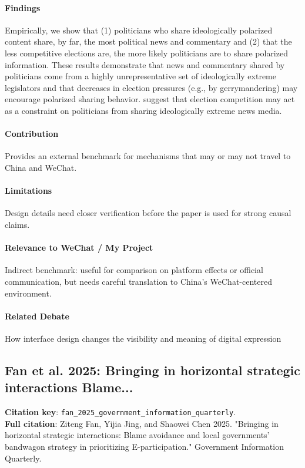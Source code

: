 \documentclass[12pt]{article}
\begin{document}
\paragraph{Findings} Empirically, we show that (1) politicians who share ideologically polarized content share, by far, the most political news and commentary and (2) that the less competitive elections are, the more likely politicians are to share polarized information. These results demonstrate that news and commentary shared by politicians come from a highly unrepresentative set of ideologically extreme legislators and that decreases in election pressures (e.g., by gerrymandering) may encourage polarized sharing behavior. suggest that election competition may act as a constraint on politicians from sharing ideologically extreme news media.

\paragraph{Contribution} Provides an external benchmark for mechanisms that may or may not travel to China and WeChat.

\paragraph{Limitations} Design details need closer verification before the paper is used for strong causal claims.

\paragraph{Relevance to WeChat / My Project} Indirect benchmark: useful for comparison on platform effects or official communication, but needs careful translation to China's WeChat-centered environment.

\paragraph{Related Debate} How interface design changes the visibility and meaning of digital expression


\subsection{Fan et al. 2025: Bringing in horizontal strategic interactions Blame...}
\textbf{Citation key}: \texttt{fan\_2025\_government\_information\_quarterly}.\\
\textbf{Full citation}: Ziteng Fan, Yijia Jing, and Shaowei Chen 2025. "Bringing in horizontal strategic interactions: Blame avoidance and local governments' bandwagon strategy in prioritizing E-participation." Government Information Quarterly.
\end{document}
